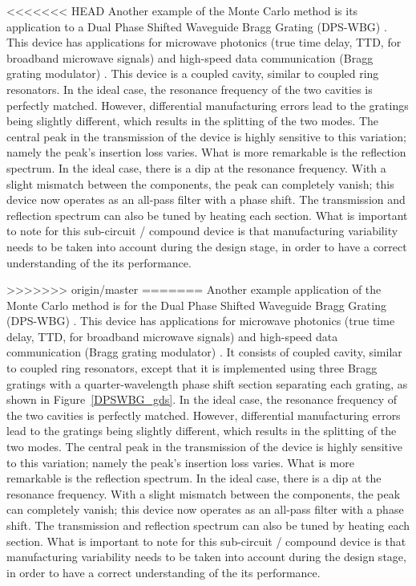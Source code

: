 \documentclass[journal]{spie}
\begin{document}
<<<<<<< HEAD
Another example of the Monte Carlo method is its application to a Dual Phase Shifted Waveguide Bragg Grating (DPS-WBG) \cite{burla2013integrated, bedard2016dual}.  This device has applications for microwave photonics (true time delay, TTD, for broadband microwave signals) \cite{burla2013integrated} and high-speed data communication (Bragg grating modulator) \cite{bedard2016dual}.  This device is a coupled cavity, similar to coupled ring resonators.  In the ideal case, the resonance frequency of the two cavities is perfectly matched.  However, differential manufacturing errors lead to the gratings being slightly different, which results in the splitting of the two modes.  The central peak in the transmission of the device is highly sensitive to this variation; namely the peak's insertion loss varies.  What is more remarkable is the reflection spectrum. In the ideal case, there is a dip at the resonance frequency.  With a slight mismatch between the components, the peak can completely vanish; this device now operates as an all-pass filter with a phase shift.  The transmission and reflection spectrum can also be tuned by heating each section.  What is important to note for this sub-circuit / compound device is that manufacturing variability needs to be taken into account during the design stage, in order to have a correct understanding of the its performance.

>>>>>>> origin/master
=======
Another example application of the Monte Carlo method is for the Dual Phase Shifted Waveguide Bragg Grating (DPS-WBG) \cite{burla2013integrated, bedard2016dual}.  This device has applications for microwave photonics (true time delay, TTD, for broadband microwave signals) \cite{burla2013integrated} and high-speed data communication (Bragg grating modulator) \cite{bedard2016dual}.  It consists of  coupled cavity, similar to coupled ring resonators, except that it is implemented using three Bragg gratings with a quarter-wavelength phase shift section separating each grating, as shown in Figure~\ref{DPSWBG_gds}.  In the ideal case, the resonance frequency of the two cavities is perfectly matched.  However, differential manufacturing errors lead to the gratings being slightly different, which results in the splitting of the two modes.  The central peak in the transmission of the device is highly sensitive to this variation; namely the peak's insertion loss varies.  What is more remarkable is the reflection spectrum. In the ideal case, there is a dip at the resonance frequency.  With a slight mismatch between the components, the peak can completely vanish; this device now operates as an all-pass filter with a phase shift.  The transmission and reflection spectrum can also be tuned by heating each section.  What is important to note for this sub-circuit / compound device is that manufacturing variability needs to be taken into account during the design stage, in order to have a correct understanding of the its performance.
\end{document}
